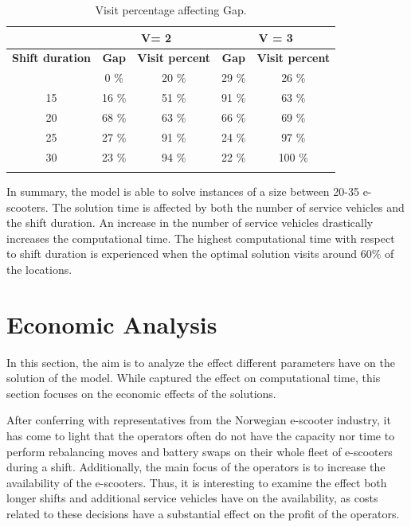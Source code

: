 \begin{table}[H]
    \centering
    \caption{Visit percentage affecting Gap.}
    \begingroup
        \setlength{\tabcolsep}{4pt} %
        \renewcommand{\arraystretch}{1} %
    \begin{tabular}{|c|c c|c c|}
        \cline{2-5}
         \multicolumn{1}{c}{} \vline & \multicolumn{2}{c}{V= 2} \vline & \multicolumn{2}{c}{V = 3} \vline\\ \hline
        \textbf{Shift duration} & \textbf{Gap} & \textbf{Visit percent} & \textbf{Gap} & \textbf{Visit percent}  \\ \thickhline
        10 & 0 \% & 20 \% & 29 \% & 26 \% \\
        15 & 16 \% & 51 \% & 91 \% & 63 \% \\
        20 & 68 \% & 63 \% & 66 \% & 69 \% \\
        25 & 27 \% & 91 \% & 24 \% & 97 \% \\
        30 & 23 \% & 94 \% & 22 \% & 100 \% \\
        \thickhline
    \end{tabular}
    \endgroup
    \label{gap_visits}
\end{table}

In summary, the model is able to solve instances of a size between 20-35 e-scooters. The solution time is affected by both the number of service vehicles and the shift duration. An increase in the number of service vehicles drastically increases the computational time. The highest computational time with respect to shift duration is experienced when the optimal solution visits around 60\% of the locations. 
   
\section{Economic Analysis} \label{econ_analysis}

In this section, the aim is to analyze the effect different parameters have on the solution of the model. While 
captured the effect on computational time, this section focuses on the economic effects of the solutions.

After conferring with representatives from the Norwegian e-scooter industry, it has come to light that the operators often do not have the capacity nor time to perform rebalancing moves and battery swaps on their whole fleet of e-scooters during a shift. Additionally, the main focus of the operators is to increase the availability of the e-scooters. Thus, it is interesting to examine the effect both longer shifts and additional service vehicles have on the availability, as costs related to these decisions have a substantial effect on the profit of the operators. 


